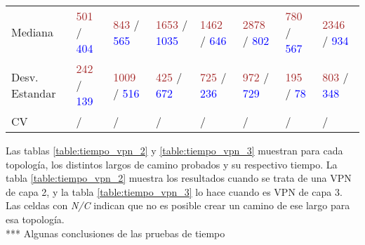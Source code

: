 \begin{table}[ht]
\begin{tabular}{p{2.2cm} p{1.4cm} p{1.4cm} p{1.4cm} p{1.4cm} p{1.4cm} p{1.4cm} p{1.4cm}}
		Mediana & \textcolor{brown}{501} / \textcolor{blue}{404} & \textcolor{brown}{843} / \textcolor{blue}{565} & \textcolor{brown}{1653} / \textcolor{blue}{1035} & \textcolor{brown}{1462} / \textcolor{blue}{646} & \textcolor{brown}{2878} / \textcolor{blue}{802} & \textcolor{brown}{780} / \textcolor{blue}{567} & \textcolor{brown}{2346} / \textcolor{blue}{934} \\
		Desv. Estandar & \textcolor{brown}{242} / \textcolor{blue}{139} & \textcolor{brown}{1009} / \textcolor{blue}{516} & \textcolor{brown}{425} / \textcolor{blue}{672} & \textcolor{brown}{725} / \textcolor{blue}{236} & \textcolor{brown}{972} / \textcolor{blue}{729} & \textcolor{brown}{195} / \textcolor{blue}{78} & \textcolor{brown}{803} / \textcolor{blue}{348} \\
		CV & \textcolor{brown}{} / \textcolor{blue}{} & \textcolor{brown}{} / \textcolor{blue}{} & \textcolor{brown}{} / \textcolor{blue}{} & \textcolor{brown}{} / \textcolor{blue}{} & \textcolor{brown}{} / \textcolor{blue}{} & \textcolor{brown}{} / \textcolor{blue}{} & \textcolor{brown}{} / \textcolor{blue}{} \\ [1ex]
		\hline
	\end{tabular}
	\label{table:tiempo_topo_grande}
\end{table}

Las tablas \ref{table:tiempo_vpn_2} y \ref{table:tiempo_vpn_3} muestran para cada topología, los distintos largos de camino probados y su respectivo tiempo. La tabla \ref{table:tiempo_vpn_2} muestra los resultados cuando se trata de una VPN de capa 2, y la tabla \ref{table:tiempo_vpn_3} lo hace cuando es VPN de capa 3. Las celdas con \textit{N/C} indican que no es posible crear un camino de ese largo para esa topología. \\


*** Algunas conclusiones de las pruebas  de tiempo \\ \\

